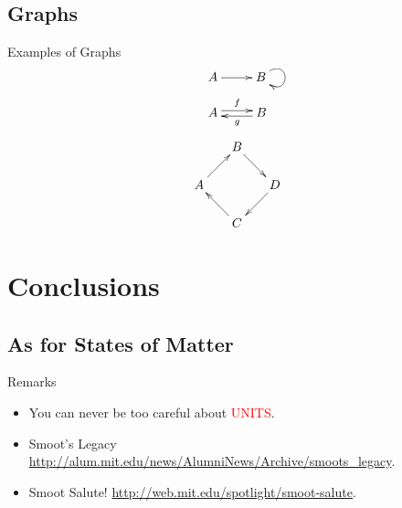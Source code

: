 \documentclass[12pt,compress]{beamer}
\begin{document}
\subsection{Graphs}
\begin{frame}{Examples of Graphs}
	\[ \xymatrix{
			A \ar[r] & B \ar@(ur,dr)
		} \]
	\[ \xymatrix{
			A \ar@<.5ex>[r]^{f} & \ar@<.5ex>[l]^{g} B
		} \]
	\[ \xymatrix@ru{
			A \ar[r] & B \ar[d] \\
			C \ar[u] & D \ar[l]
		} \]

\end{frame}


\section{Conclusions}

\subsection{As for States of Matter}
\begin{frame}{Remarks}
	\begin{itemize}
		\item You can never be too careful about \textcolor{red}{UNITS}.
		\item Smoot's Legacy \url{http://alum.mit.edu/news/AlumniNews/Archive/smoots_legacy}.
		\item Smoot Salute! \url{http://web.mit.edu/spotlight/smoot-salute}.
	\end{itemize}
\end{frame}

\end{document}
